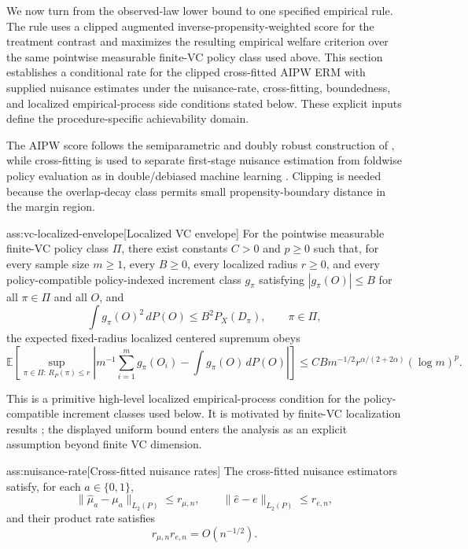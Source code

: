 \documentclass[11pt]{article}
\begin{document}
We now turn from the observed-law lower bound to one specified empirical rule.  The rule uses a clipped augmented inverse-propensity-weighted score for the treatment contrast and maximizes the resulting empirical welfare criterion over the same pointwise measurable finite-VC policy class used above.  This section establishes a conditional rate for the clipped cross-fitted AIPW ERM with supplied nuisance estimates under the nuisance-rate, cross-fitting, boundedness, and localized empirical-process side conditions stated below.  These explicit inputs define the procedure-specific achievability domain.

The AIPW score follows the semiparametric and doubly robust construction of \citet{Robins1994,Hahn1998,Hirano2003,VanDerLaan2011}, while cross-fitting is used to separate first-stage nuisance estimation from foldwise policy evaluation as in double/debiased machine learning \citep{Chernozhukov2018,Chernozhukov2022}.  Clipping is needed because the overlap-decay class permits small propensity-boundary distance in the margin region.

\begin{assumptionv}{ass:vc-localized-envelope}[Localized VC envelope]
For the pointwise measurable finite-VC policy class \(\Pi\), there exist constants \(C>0\) and \(p\ge0\) such that, for every sample size \(m\ge1\), every \(B\ge0\), every localized radius \(r\ge0\), and every policy-compatible policy-indexed increment class \(g_\pi\) satisfying \(|g_\pi(O)|\le B\) for all \(\pi\in\Pi\) and all \(O\), and
\[
\int g_\pi(O)^2\,dP(O) \le B^2 P_X(D_\pi),\qquad \pi\in\Pi,
\]
the expected fixed-radius localized centered supremum obeys
\[
\mathbb E\left[\sup_{\pi\in\Pi:\,R_P(\pi)\le r}\left|m^{-1}\sum_{i=1}^m g_\pi(O_i)-\int g_\pi(O)\,dP(O)\right|\right]
\le C B m^{-1/2} r^{\alpha/(2+2\alpha)}(\log m)^p .
\]
\end{assumptionv}

This is a primitive high-level localized empirical-process condition for the policy-compatible increment classes used below.  It is motivated by finite-VC localization results \citep{BartlettBousquetMendelson2005Local}; the displayed uniform bound enters the analysis as an explicit assumption beyond finite VC dimension.

\begin{assumptionv}{ass:nuisance-rate}[Cross-fitted nuisance rates]
The cross-fitted nuisance estimators satisfy, for each \(a\in\{0,1\}\),
\[
\|\widehat\mu_a-\mu_a\|_{L_2(P)}\le r_{\mu,n},
\qquad
\|\widehat e-e\|_{L_2(P)}\le r_{e,n},
\]
and their product rate satisfies
\[
r_{\mu,n}r_{e,n}=O(n^{-1/2}).
\]
\end{assumptionv}
\end{document}
